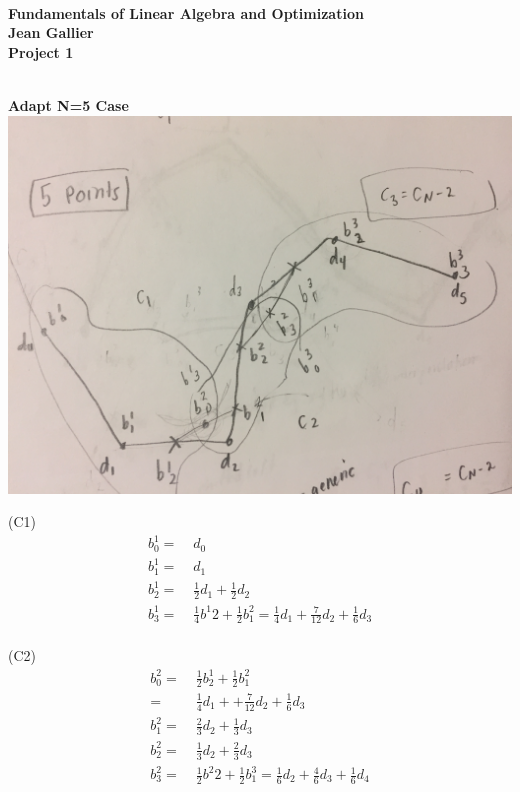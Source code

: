 \documentclass[12pt]{article}
\begin{document}
\begin{center}
\\
\vspace{1cm}
{\Large\bf Fundamentals of Linear Algebra and Optimization\\
Jean Gallier \\
\vspace{0.5cm}
Project 1}\\[10pt]
\end{center}

\\
\vspace {0.25cm}\noindent
{\bf Adapt N=5 Case} \\

\includegraphics[scale=.1]{5Points}

(C1)
\begin{align*}
b^{1}_{0} =&\; d_0 \\
b^{1}_{1} =&\; d_1 \\
b^{1}_{2} =&\; \frac{1}{2} d_1 + \frac{1}{2}d_2 \\
b^{1}_{3} =&\; \frac{1}{4} b^{1}{2} + \frac{1}{2} b^{2}_{1} =\frac{1}{4}d_1 +\frac{7}{12}d_2 + \frac{1}{6}d_3 \\
\end{align*}

(C2)
\begin{align*}
b^{2}_{0} =&\; \frac{1}{2} b^{1}_{2} + \frac{1}{2} b^{2}_{1}\\
=&\; \frac{1}{4} d_1 + +\frac{7}{12}d_2 + \frac{1}{6}d_3 \\
b^{2}_{1} =&\; \frac{2}{3} d_2 + \frac{1}{3}d_3 \\
b^{2}_{2} =&\; \frac{1}{3} d_2 + \frac{2}{3}d_3 \\
b^{2}_{3} =&\; \frac{1}{2} b^{2}{2} + \frac{1}{2} b^{3}_{1} =\frac{1}{6}d_2 +\frac{4}{6}d_3 + \frac{1}{6}d_4 \\
\end{align*}
\end{document}
